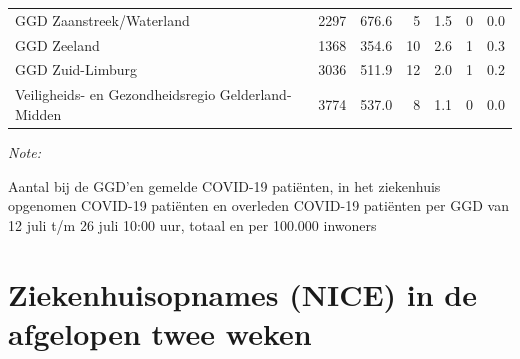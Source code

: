 \documentclass[
  english,
  man,floatsintext]{apa6}
\begin{document}
\begin{table}
\begin{threeparttable}
\begin{tabular}{lrrrrrr}
GGD Zaanstreek/Waterland & 2297 & 676.6 & 5 & 1.5 & 0 & 0.0\\
GGD Zeeland & 1368 & 354.6 & 10 & 2.6 & 1 & 0.3\\
GGD Zuid-Limburg & 3036 & 511.9 & 12 & 2.0 & 1 & 0.2\\
Veiligheids- en Gezondheidsregio Gelderland-Midden & 3774 & 537.0 & 8 & 1.1 & 0 & 0.0\\
\bottomrule
\end{tabular}
\begin{tablenotes}
\item \textit{Note: } 
\item Aantal bij de GGD’en gemelde COVID-19 patiënten, in het ziekenhuis opgenomen COVID-19 patiënten en overleden COVID-19 patiënten per GGD van 12 juli t/m 26 juli 10:00 uur, totaal en per 100.000 inwoners
\end{tablenotes}
\end{threeparttable}
\endgroup{}
\end{table}

\newpage

\hypertarget{ziekenhuisopnames-nice-in-de-afgelopen-twee-weken}{%
\section{Ziekenhuisopnames (NICE) in de afgelopen twee weken}\label{ziekenhuisopnames-nice-in-de-afgelopen-twee-weken}}
\end{document}
